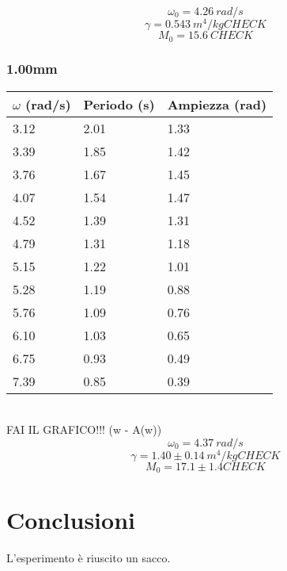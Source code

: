 \documentclass[a4paper,10pt]{report}
\begin{document}
$$ \omega_0 = 4.26\ rad/s $$
$$ \gamma = 0.543\ m^4/kg  CHECK $$
$$ M_0 = 15.6\ CHECK $$


\subsubsection{1.00mm}
\begin{tabular}{l|l|l}
$\omega$ (rad/s) & Periodo (s) & Ampiezza (rad) \\
\midrule
3.12 & 2.01 & 1.33 \\
3.39 & 1.85 & 1.42 \\
3.76 & 1.67 & 1.45 \\
4.07 & 1.54 & 1.47 \\
4.52 & 1.39 & 1.31 \\
4.79 & 1.31 & 1.18 \\
5.15 & 1.22 & 1.01 \\
5.28 & 1.19 & 0.88 \\
5.76 & 1.09 & 0.76 \\
6.10 & 1.03 & 0.65 \\
6.75 & 0.93 & 0.49 \\
7.39 & 0.85 & 0.39 \\
\midrule
\end{tabular}
\\
FAI IL GRAFICO!!! (w - A(w))
\\

$$ \omega_0 = 4.37\ rad/s $$
$$ \gamma = 1.40 \pm 0.14\ m^4/kg  CHECK $$
$$ M_0 = 17.1 \pm 1.4 CHECK $$
\section{Conclusioni}
L'esperimento è riuscito un sacco.
\end{document}
